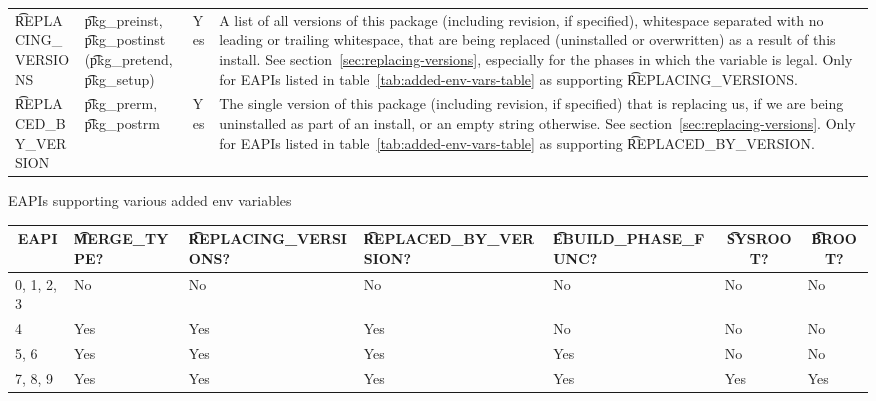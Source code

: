 \begin{landscape}
\begin{longtable}{l P{7em} l p{\mycolwidth}}
\t{REPLACING_VERSIONS} &
    \t{pkg_preinst}, \t{pkg_postinst} (\t{pkg_pretend}, \t{pkg_setup}) &
    Yes &
    A list of all versions of this package (including revision, if specified), whitespace separated
    with no leading or trailing whitespace, that are being replaced (uninstalled or overwritten)
    as a result of this install. See section~\ref{sec:replacing-versions}, especially for the phases
    in which the variable is legal. Only for EAPIs listed in table~\ref{tab:added-env-vars-table}
    as supporting \t{REPLACING_VERSIONS}. \\
\t{REPLACED_BY_VERSION} &
    \t{pkg_prerm}, \t{pkg_postrm} &
    Yes &
    The single version of this package (including revision, if specified) that is replacing us,
    if we are being uninstalled as part of an install, or an empty string otherwise.
    See section~\ref{sec:replacing-versions}. Only for EAPIs listed in
    table~\ref{tab:added-env-vars-table} as supporting \t{REPLACED_BY_VERSION}. \\
\end{longtable}

\addtocounter{footnote}{6}
\end{landscape}

\begin{centertable}{EAPIs supporting various added env variables}
    \label{tab:added-env-vars-table}
    \begin{tabular}{lllllll}
      \toprule
      \multicolumn{1}{c}{\textbf{EAPI}} &
      \multicolumn{1}{P{3.25em}}{\textbf{\t{MERGE_TYPE}?}} &
      \multicolumn{1}{P{5.25em}}{\textbf{\t{REPLACING_VERSIONS}?}} &
      \multicolumn{1}{P{5.75em}}{\textbf{\t{REPLACED_BY_VERSION}?}} &
      \multicolumn{1}{P{5.75em}}{\textbf{\t{EBUILD_PHASE_FUNC}?}} &
      \multicolumn{1}{c}{\textbf{\t{SYSROOT}?}} &
      \multicolumn{1}{c}{\textbf{\t{BROOT}?}} \\
      \midrule
      0, 1, 2, 3        & No  & No  & No  & No  & No  & No  \\
      4                 & Yes & Yes & Yes & No  & No  & No  \\
      5, 6              & Yes & Yes & Yes & Yes & No  & No  \\
      7, 8, 9           & Yes & Yes & Yes & Yes & Yes & Yes \\
      \bottomrule
    \end{tabular}
\end{centertable}

